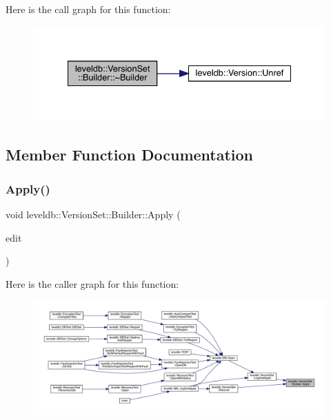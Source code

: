 Here is the call graph for this function\+:
\nopagebreak
\begin{figure}[H]
\begin{center}
\leavevmode
\includegraphics[width=334pt]{classleveldb_1_1_version_set_1_1_builder_acd7047ca78d8c654967101f53d10792c_cgraph}
\end{center}
\end{figure}


\subsection{Member Function Documentation}
\mbox{\label{classleveldb_1_1_version_set_1_1_builder_aef505b4363ebc56b8fa5deb55087993f}} 
\subsubsection{\texorpdfstring{Apply()}{Apply()}}
{\footnotesize\ttfamily void leveldb\+::\+Version\+Set\+::\+Builder\+::\+Apply (\begin{DoxyParamCaption}\item[{\mbox{\hyperlink{classleveldb_1_1_version_edit}{Version\+Edit}} $\ast$}]{edit }\end{DoxyParamCaption})\hspace{0.3cm}{\ttfamily [inline]}}

Here is the caller graph for this function\+:
\nopagebreak
\begin{figure}[H]
\begin{center}
\leavevmode
\includegraphics[width=350pt]{classleveldb_1_1_version_set_1_1_builder_aef505b4363ebc56b8fa5deb55087993f_icgraph}
\end{center}
\end{figure}
\mbox{\label{classleveldb_1_1_version_set_1_1_builder_aa90e0d9d0f8e05b8bcfa879d4f4a88c6}} 
